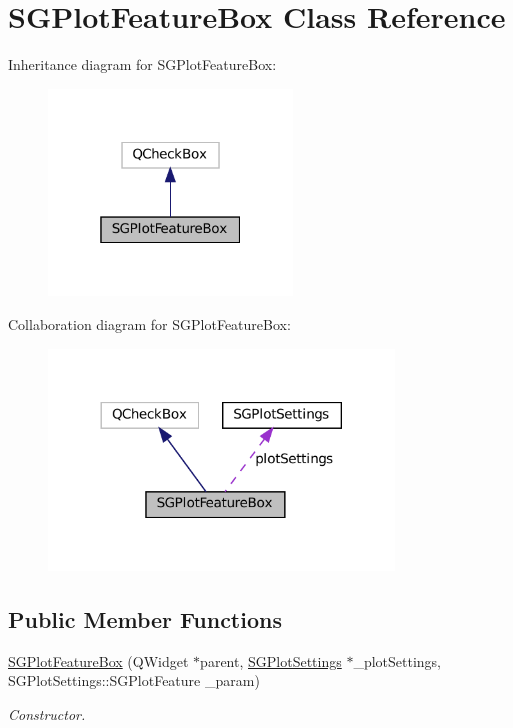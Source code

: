 \hypertarget{classSGPlotFeatureBox}{}\section{S\+G\+Plot\+Feature\+Box Class Reference}
\label{classSGPlotFeatureBox}


Inheritance diagram for S\+G\+Plot\+Feature\+Box\+:
\nopagebreak
\begin{figure}[H]
\begin{center}
\leavevmode
\includegraphics[width=184pt]{classSGPlotFeatureBox__inherit__graph}
\end{center}
\end{figure}


Collaboration diagram for S\+G\+Plot\+Feature\+Box\+:
\nopagebreak
\begin{figure}[H]
\begin{center}
\leavevmode
\includegraphics[width=260pt]{classSGPlotFeatureBox__coll__graph}
\end{center}
\end{figure}
\subsection*{Public Member Functions}
\begin{DoxyCompactItemize}
\item 
\mbox{\label{classSGPlotFeatureBox_a0fb4d2559950d7c4b6f98ffab57c5308}} 
\hyperlink{classSGPlotFeatureBox_a0fb4d2559950d7c4b6f98ffab57c5308}{S\+G\+Plot\+Feature\+Box} (Q\+Widget $\ast$parent, \hyperlink{classSGPlotSettings}{S\+G\+Plot\+Settings} $\ast$\+\_\+plot\+Settings, S\+G\+Plot\+Settings\+::\+S\+G\+Plot\+Feature \+\_\+param)
\begin{DoxyCompactList}\small\item\em Constructor. \end{DoxyCompactList}\end{DoxyCompactItemize}
